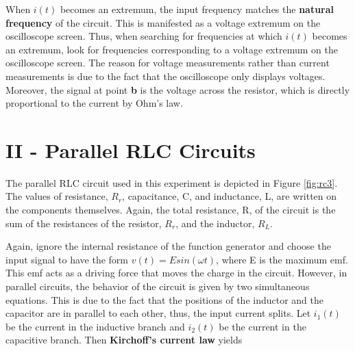 When $i(t)$ becomes an extremum, the input frequency matches the {\bf natural frequency} of the circuit. This is manifested as a voltage extremum on the oscilloscope screen. Thus, when searching for frequencies at which $i(t)$ becomes an extremum, look for frequencies corresponding to a voltage extremum on the oscilloscope screen. The reason for voltage measurements rather than current measurements is due to the fact that the oscilloscope only displays voltages. Moreover, the signal at point {\bf b} is the voltage across the resistor, which is directly proportional to the current by Ohm's law.

\section{II - Parallel RLC Circuits}
The parallel RLC circuit used in this experiment is depicted in Figure \ref{fig:rc3}. The values of resistance, $R_r$, capacitance, C, and inductance, L, are written on the components themselves. Again, the total resistance, R, of the circuit is the sum of the resistances of the resistor, $R_r$, and the inductor, $R_L$.

Again, ignore the internal resistance of the function generator and choose the input signal to have the form $v(t)=Esin(\omega t)$, where E is the maximum emf. This emf acts as a driving force that moves the charge in the circuit. However, in parallel circuits, the behavior of the circuit is given by two simultaneous equations. This is due to the fact that the positions of the inductor and the capacitor are in parallel to each other, thus, the input current splits. Let $i_1(t)$ be the current in the inductive branch and $i_2(t)$ be the current in the capacitive branch. Then {\bf Kirchoff's current law} yields

